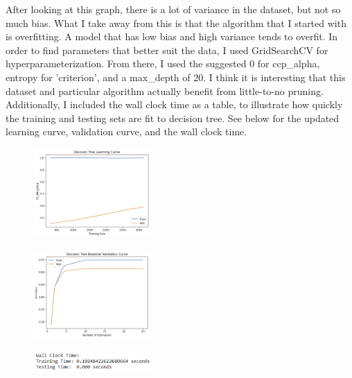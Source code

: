 \documentclass[conference]{IEEEtran}
\begin{document}
After looking at this graph, there is a lot of variance in the dataset, but not so much bias. What I take away from this is that the algorithm that I started with is overfitting. A model that has low bias and high variance tends to overfit. In order to find parameters that better suit the data, I used GridSearchCV for hyperparameterization. From there, I used the suggested 0 for ccp\_alpha, entropy for 'criterion', and a max\_depth of 20. I think it is interesting that this dataset and particular algorithm actually benefit from little-to-no pruning. Additionally, I included the wall clock time as a table, to illustrate how quickly the training and testing sets are fit to decision tree. See below for the updated learning curve, validation curve, and the wall clock time.

\begin{figure}[H]
    \centering
    \includegraphics[width=0.40\textwidth]{Red Wine Quality Graph Images/Decision Trees/dt lc final.png}
    \label{fig:enter-label}
\end{figure}

\begin{figure}[H]
    \centering
    \includegraphics[width=0.40\textwidth]{Red Wine Quality Graph Images/Decision Trees/dtc valid curve.png}
    \label{fig:enter-label}
\end{figure}

\begin{figure}[H]
    \centering
    \includegraphics[width=0.40\textwidth]{Red Wine Quality Graph Images/Decision Trees/dtc wall clock time.png}
    \label{fig:enter-label}
\end{figure}
\end{document}
